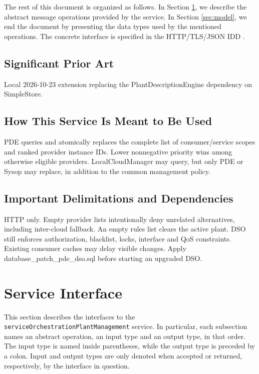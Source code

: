 \documentclass[a4paper]{arrowhead}
\begin{document}
The rest of this document is organized as follows.
In Section \ref{sec:operations}, we describe the abstract message operations provided by the service.
In Section \ref{sec:model}, we end the document by presenting the data types used by the mentioned operations.
The concrete interface is specified in the HTTP/TLS/JSON IDD \cite{dso-serviceOrchestrationPlantManagement-http-idd}.

\subsection{Significant Prior Art}

Local 2026-10-23 extension replacing the Plant\allowbreak{}Description\allowbreak{}Engine dependency on SimpleStore.

\subsection{How This Service Is Meant to Be Used}

PDE queries and atomically replaces the complete list of consumer/service scopes and ranked provider instance IDs. Lower nonnegative priority wins among otherwise eligible providers. LocalCloudManager may query, but only PDE or Sysop may replace, in addition to the common management policy.

\subsection{Important Delimitations and Dependencies}
\label{sec:delimitations}

HTTP only. Empty provider lists intentionally deny unrelated alternatives, including inter-cloud fallback. An empty rules list clears the active plant. DSO still enforces authorization, blacklist, locks, interface and QoS constraints. Existing consumer caches may delay visible changes. Apply database\_patch\_pde\_dso.sql before starting an upgraded DSO.

\newpage

\section{Service Interface}
\label{sec:operations}

This section describes the interfaces to the \texttt{service\allowbreak{}Orchestration\allowbreak{}Plant\allowbreak{}Management} service.
In particular, each subsection names an abstract operation, an input type and an output type, in that order.
The input type is named inside parentheses, while the output type is preceded by a colon.
Input and output types are only denoted when accepted or returned, respectively, by the interface in question.
\end{document}
